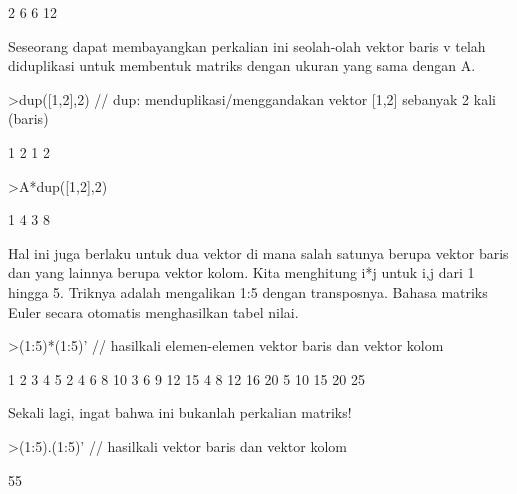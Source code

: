 \documentclass{article}
\newenvironment{eulernotebook}{\par}{\par}
\newenvironment{eulercomment}{\par\medskip}{\par\medskip}
\begin{document}
\begin{eulernotebook}
\begin{eulercomment}
\begin{eulercomment}
\begin{eulercomment}
\begin{eulercomment}
\begin{euleroutput}
              2             6 
              6            12 
\end{euleroutput}
\begin{eulercomment}
Seseorang dapat membayangkan perkalian ini seolah-olah vektor baris v
telah diduplikasi untuk membentuk matriks dengan ukuran yang sama
dengan A.
\end{eulercomment}
\begin{eulerprompt}
>dup([1,2],2) // dup: menduplikasi/menggandakan vektor [1,2] sebanyak 2 kali (baris)
\end{eulerprompt}
\begin{euleroutput}
              1             2 
              1             2 
\end{euleroutput}
\begin{eulerprompt}
>A*dup([1,2],2) 
\end{eulerprompt}
\begin{euleroutput}
              1             4 
              3             8 
\end{euleroutput}
\begin{eulercomment}
Hal ini juga berlaku untuk dua vektor di mana salah satunya berupa
vektor baris dan yang lainnya berupa vektor kolom. Kita menghitung i*j
untuk i,j dari 1 hingga 5. Triknya adalah mengalikan 1:5 dengan
transposnya. Bahasa matriks Euler secara otomatis menghasilkan tabel
nilai.
\end{eulercomment}
\begin{eulerprompt}
>(1:5)*(1:5)' // hasilkali elemen-elemen vektor baris dan vektor kolom
\end{eulerprompt}
\begin{euleroutput}
              1             2             3             4             5 
              2             4             6             8            10 
              3             6             9            12            15 
              4             8            12            16            20 
              5            10            15            20            25 
\end{euleroutput}
\begin{eulercomment}
Sekali lagi, ingat bahwa ini bukanlah perkalian matriks!
\end{eulercomment}
\begin{eulerprompt}
>(1:5).(1:5)' // hasilkali vektor baris dan vektor kolom
\end{eulerprompt}
\begin{euleroutput}
  55
\end{euleroutput}

\end{eulercomment}
\end{eulercomment}
\end{eulercomment}
\end{eulercomment}
\end{eulernotebook}
\end{document}
